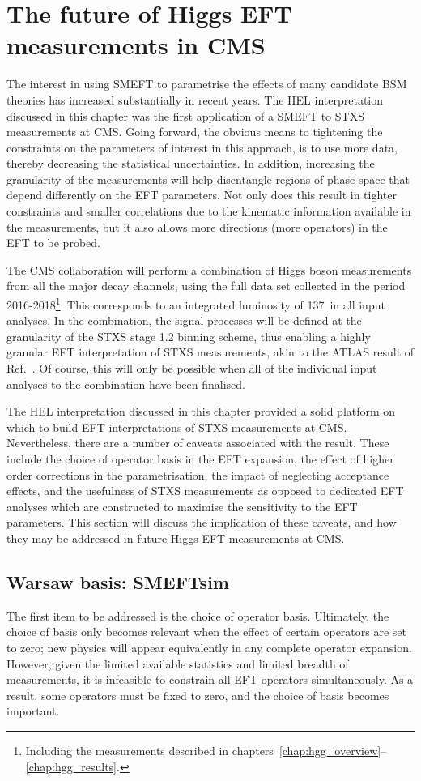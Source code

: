 \section{The future of Higgs EFT measurements in CMS}\label{sec:eft_improving}
The interest in using SMEFT to parametrise the effects of many candidate BSM theories has increased substantially in recent years. The HEL interpretation discussed in this chapter was the first application of a SMEFT to STXS measurements at CMS. Going forward, the obvious means to tightening the constraints on the parameters of interest in this approach, is to use more data, thereby decreasing the statistical uncertainties. In addition, increasing the granularity of the measurements will help disentangle regions of phase space that depend differently on the EFT parameters. Not only does this result in tighter constraints and smaller correlations due to the kinematic information available in the measurements, but it also allows more directions (more operators) in the EFT to be probed.  

The CMS collaboration will perform a combination of Higgs boson measurements from all the major decay channels, using the full data set collected in the period 2016-2018\footnote{Including the \Hgg measurements described in chapters~\ref{chap:hgg_overview}--\ref{chap:hgg_results}.}. This corresponds to an integrated luminosity of 137~\fbinv in all input analyses. In the combination, the signal processes will be defined at the granularity of the STXS stage 1.2 binning scheme, thus enabling a highly granular EFT interpretation of STXS measurements, akin to the ATLAS result of Ref.~\cite{ATLAS-CONF-2020-053}. Of course, this will only be possible when all of the individual input analyses to the combination have been finalised.

The HEL interpretation discussed in this chapter provided a solid platform on which to build EFT interpretations of STXS measurements at CMS. Nevertheless, there are a number of caveats associated with the result. These include the choice of operator basis in the EFT expansion, the effect of higher order corrections in the parametrisation, the impact of neglecting acceptance effects, and the usefulness of STXS measurements as opposed to dedicated EFT analyses which are constructed to maximise the sensitivity to the EFT parameters. This section will discuss the implication of these caveats, and how they may be addressed in future Higgs EFT measurements at CMS.

\subsection{Warsaw basis: SMEFTsim}\label{sec:smeftsim}
The first item to be addressed is the choice of operator basis. Ultimately, the choice of basis only becomes relevant when the effect of certain operators are set to zero; new physics will appear equivalently in any complete operator expansion. However, given the limited available statistics and limited breadth of measurements, it is infeasible to constrain all EFT operators simultaneously. As a result, some operators must be fixed to zero, and the choice of basis becomes important.

